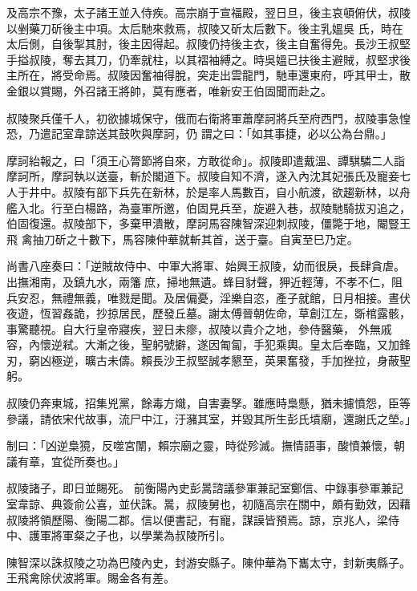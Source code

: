 \begin{pinyinscope}
 及高宗不豫，太子諸王並入侍疾。高宗崩于宣福殿，翌日旦，後主哀頓俯伏，叔陵以剉藥刀斫後主中項。太后馳來救焉，叔陵又斫太后數下。後主乳媼吳
 氏，時在太后側，自後掣其肘，後主因得起。叔陵仍持後主衣，後主自奮得免。長沙王叔堅手搤叔陵，奪去其刀，仍牽就柱，以其褶袖縛之。時吳媼已扶後主避賊，叔堅求後主所在，將受命焉。叔陵因奮袖得脫，突走出雲龍門，馳車還東府，呼其甲士，散金銀以賞賜，外召諸王將帥，莫有應者，唯新安王伯固聞而赴之。



 叔陵聚兵僅千人，初欲據城保守，俄而右衛將軍蕭摩訶將兵至府西門，叔陵事急惶恐，乃遣記室韋諒送其鼓吹與摩訶，仍
 謂之曰：「如其事捷，必以公為台鼎。」



 摩訶紿報之，曰「須王心膂節將自來，方敢從命」。叔陵即遣戴溫、譚騏驎二人詣摩訶所，摩訶執以送臺，斬於閣道下。叔陵自知不濟，遂入內沈其妃張氏及寵妾七人于井中。叔陵有部下兵先在新林，於是率人馬數百，自小航渡，欲趨新林，以舟艦入北。行至白楊路，為臺軍所邀，伯固見兵至，旋避入巷，叔陵馳騎拔刃追之，伯固復還。叔陵部下，多棄甲潰散，摩訶馬容陳智深迎刺叔陵，僵斃于地，閹豎王飛
 禽抽刀斫之十數下，馬容陳仲華就斬其首，送于臺。自寅至巳乃定。



 尚書八座奏曰：「逆賊故侍中、中軍大將軍、始興王叔陵，幼而很戾，長肆貪虐。出撫湘南，及鎮九水，兩籓庶，掃地無遺。蜂目豺聲，狎近輕薄，不孝不仁，阻兵安忍，無禮無義，唯戮是聞。及居偏憂，淫樂自恣，產子就館，日月相接。晝伏夜遊，恆習姦詭，抄掠居民，歷發丘墓。謝太傅晉朝佐命，草創江左，斲棺露骸，事驚聽視。自大行皇帝寢疾，翌日未瘳，叔陵以貴介之地，參侍醫藥，
 外無戚容，內懷逆弒。大漸之後，聖躬號擗，遂因匍匐，手犯乘輿。皇太后奉臨，又加鋒刃，窮凶極逆，曠古未儔。賴長沙王叔堅誠孝懇至，英果奮發，手加挫拉，身蔽聖躬。



 叔陵仍奔東城，招集兇黨，餘毒方熾，自害妻孥。雖應時梟懸，猶未攄憤怨，臣等參議，請依宋代故事，流尸中江，汙瀦其室，并毀其所生彭氏墳廟，還謝氏之塋。」



 制曰：「凶逆梟獍，反噬宮闈，賴宗廟之靈，時從殄滅。撫情語事，酸憤兼懷，朝議有章，宜從所奏也。」



 叔陵諸子，即日並賜死。
 前衡陽內史彭暠諮議參軍兼記室鄭信、中錄事參軍兼記室韋諒、典簽俞公喜，並伏誅。暠，叔陵舅也，初隨高宗在關中，頗有勤效，因藉叔陵將領歷陽、衡陽二郡。信以便書記，有寵，謀謨皆預焉。諒，京兆人，梁侍中、護軍將軍粲之子也，以學業為叔陵所引。



 陳智深以誅叔陵之功為巴陵內史，封游安縣子。陳仲華為下巂太守，封新夷縣子。王飛禽除伏波將軍。賜金各有差。




\end{pinyinscope}

